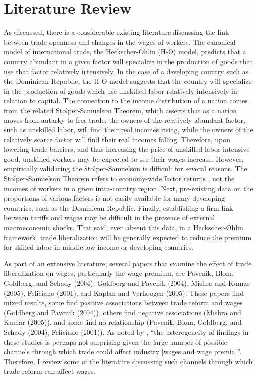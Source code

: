 \documentclass[12pt]{article}
\begin{document}
\section{Literature Review}
\label{sec:Litreview}
As discussed, there is a considerable existing literature discussing the link between trade openness
and changes in the wages of workers.
The canonical model of international trade, the Heckscher-Ohlin (H-O) model, 
predicts that a country abundant in a given factor will specialize 
in the production of goods that use that factor relatively intensively.
In the case of a developing country such as the Dominican Republic, the 
H-O model suggests that the country will specialize in the production of goods
which use unskilled labor relatively intensively in relation to capital. 
The connection to the income distribution of a nation comes from the related Stolper-Samuelson Theorem,
which asserts that as a nation moves from autarky to free trade, the owners of the relatively
abundant factor, such as unskilled labor, will find their real incomes rising, while the owners of
the relatively scarce factor will find their real incomes falling. 
Therefore, upon lowering trade barriers, and thus increasing the price of unskilled labor intensive
good, unskilled workers may be expected to see their wages
increase. However, empirically validating the Stolper-Samuelson is difficult for several reasons. 
The Stolper-Samuelson Theorem refers to economy-wide factor returns \citep{goldberg}, not the 
incomes of workers in a  given intra-country region. Next, pre-existing data on the  proportions
of various factors is not easily available for many developing countries, such as the Dominican Republic.
Finally, establishing a firm link between tariffs and wages may be difficult in the presence of external
macroeconomic shocks. That said, even absent this data, in a Heckscher-Ohlin framework, trade 
liberalization will be generally expected to reduce the premium for skilled labor in middle-low 
income or developing countries. 

As part of an extensive literature, several papers that examine the effect of trade liberalization on 
wages, particularly the wage premium, are Pavcnik, Blom, Goldberg, and Schady (2004), Goldberg
and Pavcnik (2004), Mishra and Kumar (2005), Feliciano (2001), and Kaplan and Verhoogen (2005).
These papers find mixed results, some find positive associations between trade reform and wages 
(Goldberg and Pavcnik (2004)), others find negative associations (Mishra and Kumar (2005)), and some 
find no relationship (Pavcnik, Blom, Goldberg, and Schady (2004), Feliciano (2001)). As noted by 
\citeauthor{goldberg}, ``the heterogeneity of findings in these studies is perhaps not surprising 
given the large number of possible channels through which trade could affect industry [wages 
and wage premia]''. Therefore, I review some of the literature discussing such channels through
which trade reform can affect wages.
\end{document}
